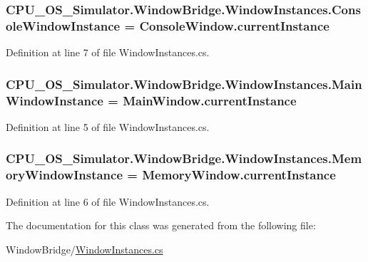 \subsubsection[{Console\+Window\+Instance}]{ C\+P\+U\+\_\+\+O\+S\+\_\+\+Simulator.\+Window\+Bridge.\+Window\+Instances.\+Console\+Window\+Instance = {\bf Console\+Window.\+current\+Instance}\hspace{0.3cm}{\ttfamily [static]}}\label{class_c_p_u___o_s___simulator_1_1_window_bridge_1_1_window_instances_a90b746b2373f150cab75e4dee0f91c45}


Definition at line 7 of file Window\+Instances.\+cs.

\hypertarget{class_c_p_u___o_s___simulator_1_1_window_bridge_1_1_window_instances_a130a2c32e8ccfd51a42ecb363fbb42cc}{}
\subsubsection[{Main\+Window\+Instance}]{ C\+P\+U\+\_\+\+O\+S\+\_\+\+Simulator.\+Window\+Bridge.\+Window\+Instances.\+Main\+Window\+Instance = {\bf Main\+Window.\+current\+Instance}\hspace{0.3cm}{\ttfamily [static]}}\label{class_c_p_u___o_s___simulator_1_1_window_bridge_1_1_window_instances_a130a2c32e8ccfd51a42ecb363fbb42cc}


Definition at line 5 of file Window\+Instances.\+cs.

\hypertarget{class_c_p_u___o_s___simulator_1_1_window_bridge_1_1_window_instances_a401fd485bde830472a1a960a25ec1464}{}
\subsubsection[{Memory\+Window\+Instance}]{ C\+P\+U\+\_\+\+O\+S\+\_\+\+Simulator.\+Window\+Bridge.\+Window\+Instances.\+Memory\+Window\+Instance = {\bf Memory\+Window.\+current\+Instance}\hspace{0.3cm}{\ttfamily [static]}}\label{class_c_p_u___o_s___simulator_1_1_window_bridge_1_1_window_instances_a401fd485bde830472a1a960a25ec1464}


Definition at line 6 of file Window\+Instances.\+cs.



The documentation for this class was generated from the following file\+:\begin{DoxyCompactItemize}
\item 
Window\+Bridge/\hyperlink{_window_instances_8cs}{Window\+Instances.\+cs}\end{DoxyCompactItemize}
